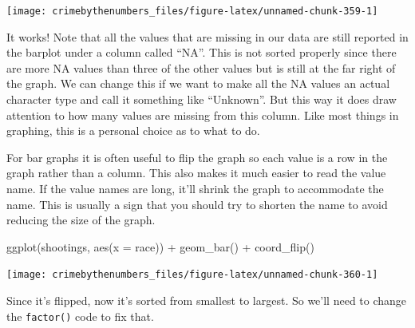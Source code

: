 \documentclass[
]{krantz}
\makeatletter
\newenvironment{Shaded}{\begin{snugshade}}{\end{snugshade}}
\newcommand{\AttributeTok}[1]{\textcolor[rgb]{0.61,0.61,0.61}{#1}}
\newcommand{\ConstantTok}[1]{\textcolor[rgb]{0,0,0}{#1}}
\newcommand{\FunctionTok}[1]{\textcolor[rgb]{0,0,0}{#1}}
\newcommand{\NormalTok}[1]{#1}
\newcommand{\OtherTok}[1]{\textcolor[rgb]{0.37,0.37,0.37}{#1}}
\newcommand{\SpecialCharTok}[1]{\textcolor[rgb]{0,0,0}{#1}}
\newenvironment{kframe}{%
\medskip{}
\setlength{\fboxsep}{.8em}
 \def\at@end@of@kframe{}%
 \ifinner\ifhmode%
  \def\at@end@of@kframe{\end{minipage}}%
  \begin{minipage}{\columnwidth}%
 \fi\fi%
 \def\FrameCommand##1{\hskip\@totalleftmargin \hskip-\fboxsep
 \colorbox{shadecolor}{##1}\hskip-\fboxsep
     \hskip-\linewidth \hskip-\@totalleftmargin \hskip\columnwidth}%
 \MakeFramed {\advance\hsize-\width
   \@totalleftmargin\z@ \linewidth\hsize
   \@setminipage}}%
 {\par\unskip\endMakeFramed%
 \at@end@of@kframe}
\renewenvironment{Shaded}{\begin{kframe}}{\end{kframe}}
\makeatother
\begin{document}
\begin{center}\texttt{[image: crimebythenumbers\_files/figure-latex/unnamed-chunk-359-1]} \end{center}

It works! Note that all the values that are missing in our data are still reported in the barplot under a column called ``NA''. This is not sorted properly since there are more NA values than three of the other values but is still at the far right of the graph. We can change this if we want to make all the NA values an actual character type and call it something like ``Unknown''. But this way it does draw attention to how many values are missing from this column. Like most things in graphing, this is a personal choice as to what to do.

For bar graphs it is often useful to flip the graph so each value is a row in the graph rather than a column. This also makes it much easier to read the value name. If the value names are long, it'll shrink the graph to accommodate the name. This is usually a sign that you should try to shorten the name to avoid reducing the size of the graph.

\begin{Shaded}
\begin{Highlighting}[]
\FunctionTok{ggplot}\NormalTok{(shootings, }\FunctionTok{aes}\NormalTok{(}\AttributeTok{x =}\NormalTok{ race)) }\SpecialCharTok{+} 
  \FunctionTok{geom\_bar}\NormalTok{() }\SpecialCharTok{+}
  \FunctionTok{coord\_flip}\NormalTok{() }
\end{Highlighting}
\end{Shaded}

\begin{center}\texttt{[image: crimebythenumbers\_files/figure-latex/unnamed-chunk-360-1]} \end{center}

Since it's flipped, now it's sorted from smallest to largest. So we'll need to change the \texttt{factor()} code to fix that.

\begin{Shaded}
\end{Shaded}
\end{document}
